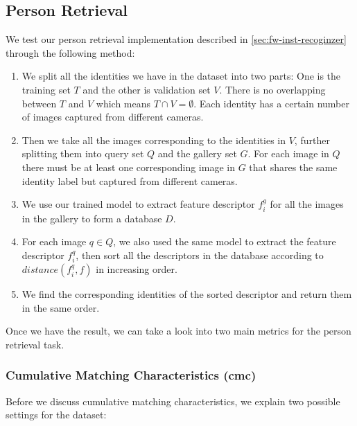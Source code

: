 \subsection{Person Retrieval}
\label{sec:Eval-reid}

We test our person retrieval implementation described
in \autoref{sec:fw-inst-recoginzer} through the following method:

\begin{enumerate}
    \item We split all the identities we have in the dataset into two parts:
    One is the training set $T$ and the other is validation set $V$. There is no
    overlapping between $T$ and $V$ which means $T \cap V = \emptyset$. Each
    identity has a certain number of images captured from different cameras.

    \item Then we take all the images corresponding to the identities in $V$,
    further splitting them into query set $Q$ and the gallery set $G$. For each
    image in $Q$ there must be at least one corresponding image in $G$ that shares
    the same identity label but captured from different cameras.

    \item We use our trained model to extract feature descriptor $f_i^g$ for
    all the images in the gallery to form a database $D$.

    \item For each image $q \in Q$, we also used the same model to extract the
    feature descriptor $f_i^q$, then sort all the descriptors in the database
    according to $\mathit{distance}(f_i^q, f)$ in increasing order.

    \item We find the corresponding identities of the sorted descriptor and return
    them in the same order.
\end{enumerate}

Once we have the result, we can take a look into two main metrics for the 
person retrieval task.

\subsubsection{Cumulative Matching Characteristics (\acrshort{cmc})}
\label{sec:Eval-reid-cmc}

Before we discuss cumulative matching characteristics, we explain
two possible settings for the dataset:


